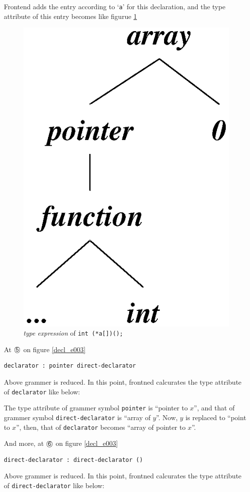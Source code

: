  Frontend adds the entry according to `{\tt{a}}'
for this declaration, and the type attribute of this entry becomes
like figurue \ref{decl_e004}
\begin{figure}[htbp]
\begin{center}
\includegraphics[width=0.5\linewidth,height=0.6\linewidth]{decl004.eps}
\caption{{\em type expression} of {\tt{int (*a[])();}}}
\label{decl_e004}
\end{center}
\end{figure}

At ${\MARU{\tt 5}}$ on figure \ref{decl_e003}
\begin{verbatim}
declarator : pointer direct-declarator
\end{verbatim}
Above grammer is reduced. In this point, frontned calcurates
the type attribute of {\tt{declarator}} like below:

The type attribute of grammer symbol {\tt{pointer}} 
is ``pointer to $x$'', and that of grammer symbol
{\tt{direct-declarator}} is ``array of $y$''.
Now, $y$ is replaced to ``point to $x$'',
then, that of {\tt{declarator}} becomes
``array of pointer to $x$''.

And more, at ${\MARU{\tt 6}}$ on figure \ref{decl_e003}
\begin{verbatim}
direct-declarator : direct-declarator ()
\end{verbatim}
Above grammer is reduced. In this point, frontned calcurates
the type attribute of {\tt{direct-declarator}} like below:

